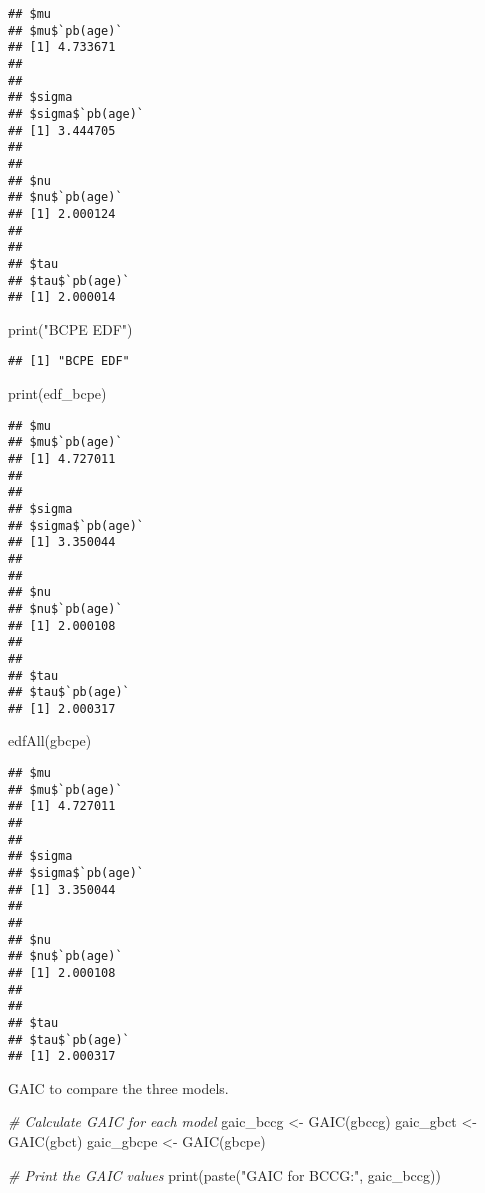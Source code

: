 \documentclass[
]{article}
\newenvironment{Shaded}{\begin{snugshade}}{\end{snugshade}}
\newcommand{\CommentTok}[1]{\textcolor[rgb]{0.56,0.35,0.01}{\textit{#1}}}
\newcommand{\FunctionTok}[1]{\textcolor[rgb]{0.00,0.00,0.00}{#1}}
\newcommand{\NormalTok}[1]{#1}
\newcommand{\OtherTok}[1]{\textcolor[rgb]{0.56,0.35,0.01}{#1}}
\newcommand{\StringTok}[1]{\textcolor[rgb]{0.31,0.60,0.02}{#1}}
\begin{document}
\begin{verbatim}
## $mu
## $mu$`pb(age)`
## [1] 4.733671
## 
## 
## $sigma
## $sigma$`pb(age)`
## [1] 3.444705
## 
## 
## $nu
## $nu$`pb(age)`
## [1] 2.000124
## 
## 
## $tau
## $tau$`pb(age)`
## [1] 2.000014
\end{verbatim}

\begin{Shaded}
\begin{Highlighting}[]
\FunctionTok{print}\NormalTok{(}\StringTok{"BCPE EDF"}\NormalTok{)}
\end{Highlighting}
\end{Shaded}

\begin{verbatim}
## [1] "BCPE EDF"
\end{verbatim}

\begin{Shaded}
\begin{Highlighting}[]
\FunctionTok{print}\NormalTok{(edf\_bcpe)}
\end{Highlighting}
\end{Shaded}

\begin{verbatim}
## $mu
## $mu$`pb(age)`
## [1] 4.727011
## 
## 
## $sigma
## $sigma$`pb(age)`
## [1] 3.350044
## 
## 
## $nu
## $nu$`pb(age)`
## [1] 2.000108
## 
## 
## $tau
## $tau$`pb(age)`
## [1] 2.000317
\end{verbatim}

\begin{Shaded}
\begin{Highlighting}[]
\FunctionTok{edfAll}\NormalTok{(gbcpe)}
\end{Highlighting}
\end{Shaded}

\begin{verbatim}
## $mu
## $mu$`pb(age)`
## [1] 4.727011
## 
## 
## $sigma
## $sigma$`pb(age)`
## [1] 3.350044
## 
## 
## $nu
## $nu$`pb(age)`
## [1] 2.000108
## 
## 
## $tau
## $tau$`pb(age)`
## [1] 2.000317
\end{verbatim}

GAIC to compare the three models.

\begin{Shaded}
\begin{Highlighting}[]
\CommentTok{\# Calculate GAIC for each model}
\NormalTok{gaic\_bccg }\OtherTok{\textless{}{-}} \FunctionTok{GAIC}\NormalTok{(gbccg)}
\NormalTok{gaic\_gbct }\OtherTok{\textless{}{-}} \FunctionTok{GAIC}\NormalTok{(gbct)}
\NormalTok{gaic\_gbcpe }\OtherTok{\textless{}{-}} \FunctionTok{GAIC}\NormalTok{(gbcpe)}

\CommentTok{\# Print the GAIC values}
\FunctionTok{print}\NormalTok{(}\FunctionTok{paste}\NormalTok{(}\StringTok{"GAIC for BCCG:"}\NormalTok{, gaic\_bccg))}
\end{Highlighting}
\end{Shaded}
\end{document}
